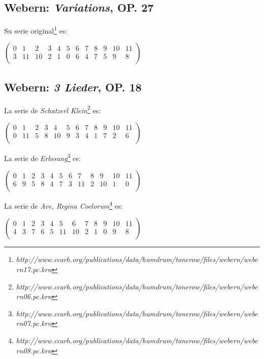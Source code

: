         \subsection*{Webern: \textit{Variations}, OP. 27}     
        
        Su serie original\footnote{\textit{http://www.ccarh.org/publications/data/humdrum/tonerow/files/webern/webern17.pc.krn}} es: 
        \begin{footnotesize}
        	$\left(\begin{matrix}0&1&2&3&4&5&6&7&8&9&10&11\\3&11&10&2&1&0&6&4&7&5&9&8\\\end{matrix}\right)$	
        \end{footnotesize}
        
        \subsection*{Webern: \textit{3 Lieder}, OP. 18}
        
        La serie de \textit{Schatzerl Klein}\footnote{\textit{http://www.ccarh.org/publications/data/humdrum/tonerow/files/webern/webern06.pc.krn}} es: 
        \begin{footnotesize}
        	$\left(\begin{matrix}0&1&2&3&4&5&6&7&8&9&10&11\\0&11&5&8&10&9&3&4&1&7&2&6\\\end{matrix}\right)$	
        \end{footnotesize}        
        
        La serie de \textit{Erlosung}\footnote{\textit{http://www.ccarh.org/publications/data/humdrum/tonerow/files/webern/webern07.pc.krn}} es: 
        \begin{footnotesize}
        	$\left(\begin{matrix}0&1&2&3&4&5&6&7&8&9&10&11\\6&9&5&8&4&7&3&11&2&10&1&0\\\end{matrix}\right)$	
        \end{footnotesize}
    
        La serie de \textit{Ave, Regina Coelorum}\footnote{\textit{http://www.ccarh.org/publications/data/humdrum/tonerow/files/webern/webern08.pc.krn}} es: 
        \begin{footnotesize}
        	$\left(\begin{matrix}0&1&2&3&4&5&6&7&8&9&10&11\\4&3&7&6&5&11&10&2&1&0&9&8\\\end{matrix}\right)$	
        \end{footnotesize}